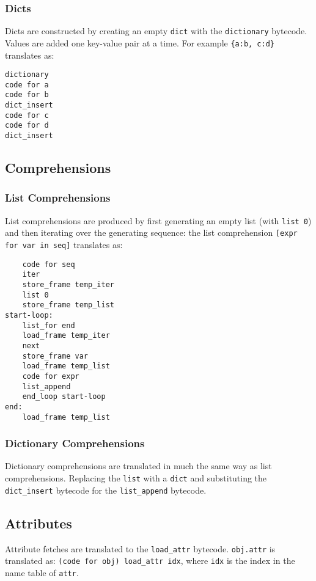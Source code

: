 \documentclass[a4paper,10pt]{article}
\begin{document}
\subsubsection{Dicts}

Dicts are constructed by creating an empty \verb|dict| with the \verb|dictionary| bytecode. Values are added one key-value pair at a time.
For example \verb|{a:b, c:d}| translates as:
\begin{verbatim}
dictionary
code for a
code for b
dict_insert
code for c
code for d
dict_insert
\end{verbatim}

\subsection{Comprehensions}

\subsubsection{List Comprehensions}

List comprehensions are produced by first generating an empty list (with \verb|list 0|) and then iterating over the generating sequence:
the list comprehension \verb|[expr for var in seq]| translates as:
\begin{verbatim}
    code for seq
    iter
    store_frame temp_iter
    list 0
    store_frame temp_list
start-loop:
    list_for end
    load_frame temp_iter
    next
    store_frame var
    load_frame temp_list
    code for expr
    list_append
    end_loop start-loop
end:
    load_frame temp_list
\end{verbatim}

\subsubsection{Dictionary Comprehensions}

Dictionary comprehensions are translated in much the same way as list comprehensions. Replacing the \verb|list| with a \verb|dict| and substituting the \verb|dict_insert| bytecode for the \verb|list_append| bytecode.

\subsection{Attributes}

Attribute fetches are translated to the \verb|load_attr| bytecode. \verb|obj.attr| is translated as: \verb|(code for obj) load_attr idx|,
 where \verb|idx| is the index in the name table of \verb|attr|.
\end{document}
